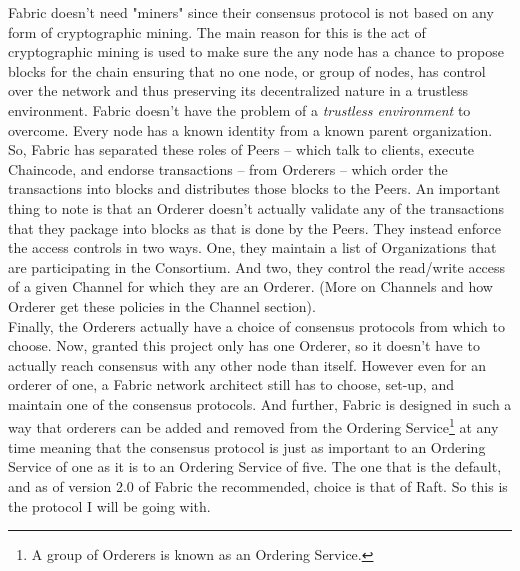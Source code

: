 		\hspace{10mm}Fabric doesn't need "miners" since their consensus protocol is not based on any form of cryptographic mining. The main reason for this is the act of cryptographic mining is used to make sure the any node has a chance to propose blocks for the chain ensuring that no one node, or group of nodes, has control over the network and thus preserving its decentralized nature in a trustless environment. Fabric doesn't have the problem of a \textit{trustless environment} to overcome. Every node has a known identity from a known parent organization.\\
		
		\hspace{10mm}So, Fabric has separated these roles of Peers -- which talk to clients, execute Chaincode, and endorse transactions -- from Orderers -- which order the transactions into blocks and distributes those blocks to the Peers. An important thing to note is that an Orderer doesn't actually validate any of the transactions that they package into blocks as that is done by the Peers. They instead enforce the access controls in two ways. One, they maintain a list of Organizations that are participating in the Consortium. And two, they control the read/write access of a given Channel for which they are an Orderer. (More on Channels and how Orderer get these policies in the Channel section).\\
		
		\hspace{10mm}Finally, the Orderers actually have a choice of  consensus protocols from which to choose. Now, granted this project only has one Orderer, so it doesn't have to actually reach consensus with any other node than itself. However even for an orderer of one, a Fabric network architect still has to choose, set-up, and maintain one of the consensus protocols. And further, Fabric is designed in such a way that orderers can be added and removed from the Ordering Service\footnote{A group of Orderers is known as an Ordering Service.} at any time meaning that the consensus protocol is just as important to an Ordering Service of one as it is to an Ordering Service of five. The one that is the default, and as of version 2.0 of Fabric the recommended, choice is that of Raft. So this is the protocol I will be going with.\\
		
